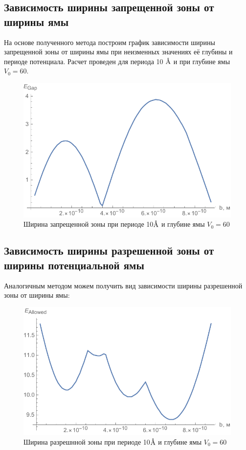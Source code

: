\documentclass[a4paper, 12pt]{article}
\newcommand{\angstrom}{\textup{\AA}}
\begin{document}
    \subsection{Зависимость ширины запрещенной зоны от ширины ямы}
    На основе полученного метода построим график зависимости ширины запрещенной зоны от ширины ямы при неизменных значениях её глубины и периоде потенциала. Расчет проведен для периода 10 $\angstrom$ и при глубине ямы $V_0=60$.
    \begin{figure}[!h]
        \centering
        \includegraphics{bandGap.pdf}
        \caption{Ширина запрещенной зоны при периоде 10$\angstrom$ и глубине ямы $V_0=60$}
    \end{figure}

    \subsection{Зависимость ширины разрешенной зоны от ширины потенциальной ямы}
    Аналогичным методом можем получить вид зависимости ширины разрешенной зоны от ширины ямы:
    \begin{figure}[!h]
        \centering
        \includegraphics{allowedBand.pdf}
        \caption{Ширина разрешнной зоны при периоде 10$\angstrom$ и глубине ямы $V_0=60$}
    \end{figure}
\end{document}
